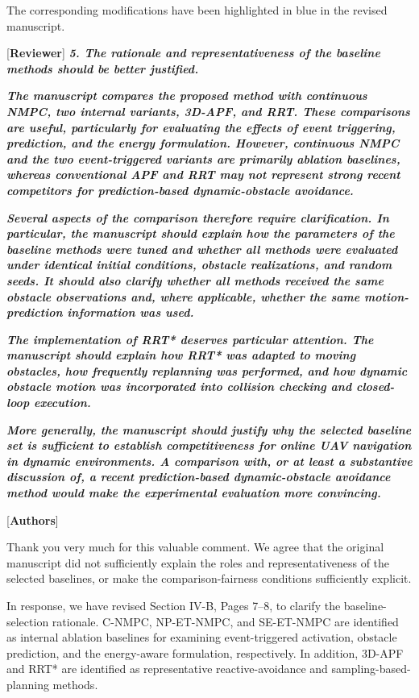 \documentclass[12pt, twosides]{article}
\theoremstyle{definition}
\begin{document}
The corresponding modifications have been highlighted in blue in the revised manuscript.

\medskip

\textcolor[rgb]{0.00,0.00,1.00}{[\textbf {Reviewer}]} \textit{\textbf{5. The rationale and representativeness of the baseline methods should be better justified.}}

\textit{\textbf{The manuscript compares the proposed method with continuous NMPC, two internal variants, 3D-APF, and RRT. These comparisons are useful, particularly for evaluating the effects of event triggering, prediction, and the energy formulation. However, continuous NMPC and the two event-triggered variants are primarily ablation baselines, whereas conventional APF and RRT may not represent strong recent competitors for prediction-based dynamic-obstacle avoidance.}}

\textit{\textbf{Several aspects of the comparison therefore require clarification. In particular, the manuscript should explain how the parameters of the baseline methods were tuned and whether all methods were evaluated under identical initial conditions, obstacle realizations, and random seeds. It should also clarify whether all methods received the same obstacle observations and, where applicable, whether the same motion-prediction information was used.}}

\textit{\textbf{The implementation of RRT* deserves particular attention. The manuscript should explain how RRT* was adapted to moving obstacles, how frequently replanning was performed, and how dynamic obstacle motion was incorporated into collision checking and closed-loop execution.}}

\textit{\textbf{More generally, the manuscript should justify why the selected baseline set is sufficient to establish competitiveness for online UAV navigation in dynamic environments. A comparison with, or at least a substantive discussion of, a recent prediction-based dynamic-obstacle avoidance method would make the experimental evaluation more convincing.}}

\textcolor[rgb]{0.00,0.00,1.00}{[\textbf{Authors}]}

Thank you very much for this valuable comment. We agree that the original manuscript did not sufficiently explain the roles and representativeness of the selected baselines, or make the comparison-fairness conditions sufficiently explicit.

In response, we have revised Section IV-B, Pages 7--8, to clarify the baseline-selection rationale. C-NMPC, NP-ET-NMPC, and SE-ET-NMPC are identified as internal ablation baselines for examining event-triggered activation, obstacle prediction, and the energy-aware formulation, respectively. In addition, 3D-APF and RRT* are identified as representative reactive-avoidance and sampling-based-planning methods.
\end{document}
